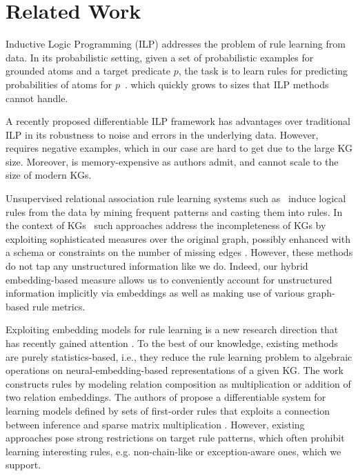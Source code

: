 
\section{Related Work}
\label{sec:related-work}


Inductive Logic Programming (ILP)
addresses the problem of rule learning from 
data.
In its probabilistic setting, given a set of probabilistic examples for grounded atoms
and a target predicate $p$,
the task is to learn rules for predicting probabilities of 
atoms for $p$~\cite{probfoil,DBLP:conf/ijcai/RaedtDTBV15,DBLP:conf/clima/CorapiSIR11}.  
which quickly grows to sizes that ILP methods cannot handle.

A recently proposed differentiable ILP framework \cite{DBLP:journals/jair/EvansG18} has advantages over traditional ILP in its robustness to noise and errors in the underlying data. 
However, \cite{DBLP:journals/jair/EvansG18} requires negative examples, which in our case are hard to 
get due to the large KG size. Moreover, \cite{DBLP:journals/jair/EvansG18} is memory-expensive
as authors admit, 
and
cannot scale to the size of modern KGs.

Unsupervised relational 
association rule learning systems such as~\cite{DBLP:conf/esf/GoethalsB02,amie} 
induce
logical rules from the data by mining frequent patterns and casting them into rules. 
In the context of KGs~\cite{amie,Chen:2016:OP:2882903.2882954,trantowards} 
such approaches 
address the incompleteness of KGs by exploiting sophisticated measures over the original graph, possibly enhanced with a schema \cite{d2016ontology} 
 or constraints on the number of missing edges \cite{carl}.
However, these methods do not tap any unstructured information like we do. 
Indeed, our hybrid embedding-based measure allows us to conveniently account for  unstructured information implicitly via embeddings as well as making use of various graph-based rule metrics.

Exploiting 
embedding models for rule learning is a new research direction that has recently gained attention \cite{DBLP:conf/nips/YangYC17,DBLP:journals/corr/YangYHGD14a}. To the best of our knowledge, existing methods are purely statistics-based, i.e., they reduce the rule learning problem to algebraic operations on neural-embedding-based representations of a  given KG. The work \cite{DBLP:journals/corr/YangYHGD14a} constructs rules by modeling relation composition as multiplication or addition of two relation embeddings. The authors of \cite{DBLP:conf/nips/YangYC17} propose a differentiable system for learning models defined by sets of first-order rules that exploits a connection between inference and sparse matrix multiplication \cite{DBLP:journals/corr/Cohen16b}. However, existing approaches pose strong restrictions on target rule patterns, which often prohibit learning interesting rules, e.g. non-chain-like or exception-aware ones, which we support.


